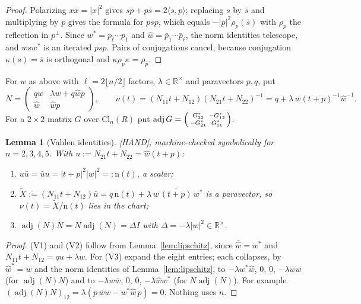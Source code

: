 \documentclass[11pt]{amsart}
\newcommand{\st}[1]{\textsf{[#1]}}
\newcommand{\R}{\mathbb{R}}
\newcommand{\Cl}{\mathrm{Cl}}
\DeclareMathOperator{\adj}{adj}
\theoremstyle{plain}
\newtheorem{lemma}[theorem]{Lemma}
\theoremstyle{definition}
\begin{document}
\begin{proof}
Polarizing $x\bar x=|x|^2$ gives $s\bar p+p\bar s=2\langle s,p\rangle$; replacing $s$ by $\bar s$
and multiplying by $p$ gives the formula for $psp$, which equals $-|p|^2\rho_p(\bar s)$ with $\rho_p$
the reflection in $p^\perp$. Since $w^*=p_\ell\cdots p_1$ and $\hat w=\bar p_1\cdots\bar p_\ell$, the norm
identities telescope, and $wsw^*$ is an iterated $psp$. Pairs of conjugations cancel, because
conjugation $\kappa(s)=\bar s$ is orthogonal and $\kappa\rho_p\kappa=\rho_{\bar p}$.
\end{proof}

For $w$ as above with $\ell=2\lfloor n/2\rfloor$ factors, $\lambda\in\R^\times$ and paravectors $p,q$,
put
\[
 N=\begin{pmatrix}q\hat w&\lambda w+q\hat wp\\ \hat w&\hat wp\end{pmatrix},\qquad
 \nu(t)=(N_{11}t+N_{12})(N_{21}t+N_{22})^{-1}=q+\lambda\,w(t+p)^{-1}\hat w^{-1}.
\]
For a $2\times2$ matrix $G$ over $\Cl_n(R)$ put
$\adj G=\begin{psmallmatrix}G_{22}^*&-G_{12}^*\\-G_{21}^*&G_{11}^*\end{psmallmatrix}$.

\begin{lemma}[Vahlen identities]\label{lem:vahlen}
\st{HAND}; machine-checked symbolically for $n=2,3,4,5$. With $u:=N_{21}t+N_{22}=\hat w(t+p)$:
\begin{enumerate}
\item[(V1)] $u\bar u=\bar uu=|t+p|^2|w|^2=:\mathrm n(t)$, a scalar;
\item[(V2)] $\tilde X:=(N_{11}t+N_{12})\bar u=q\,\mathrm n(t)+\lambda\,w\,\overline{(t+p)}\,w^*$ is a
paravector, so $\nu(t)=\tilde X/\mathrm n(t)$ lies in the chart;
\item[(V3)] $\adj(N)N=N\adj(N)=\Delta I$ with $\Delta=-\lambda|w|^2\in\R^\times$.
\end{enumerate}
\end{lemma}

\begin{proof}
(V1) and (V2) follow from Lemma~\ref{lem:lipschitz}, since $\bar{\hat w}=w^*$ and $N_{11}t+N_{12}=qu+\lambda
w$. For (V3) expand the eight entries; each collapses, by $\hat w^*=\bar w$ and the norm identities of
Lemma~\ref{lem:lipschitz}, to $-\lambda w^*\hat w$, $0$, $0$, $-\lambda\bar ww$ (for $\adj(N)N$) and
to $-\lambda w\bar w$, $0$, $0$, $-\lambda\hat ww^*$ (for $N\adj(N)$). For example
$(\adj(N)N)_{12}=\lambda(p\,\bar ww-w^*\hat w\,p)=0$. Nothing uses $n$.
\end{proof}
\end{document}
